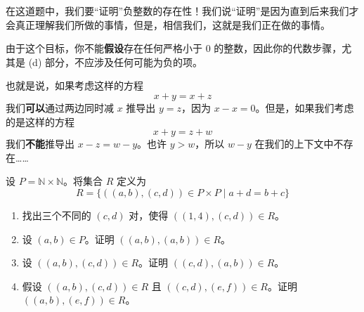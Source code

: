\begin{exercise}\label{exc:exercises3.11.22}
    在这道题中，我们要``证明''负整数的存在性！我们说``证明''是因为直到后来我们才会真正理解我们所做的事情，但是，相信我们，这就是我们正在做的事情。

    由于这个目标，你不能\textbf{假设}存在任何严格小于 $0$ 的整数，因此你的代数步骤，尤其是 (d) 部分，不应涉及任何可能为负的项。

    也就是说，如果考虑这样的方程
    \[x + y = x + z\]
    我们\textbf{可以}通过两边同时减 $x$ 推导出 $y = z$，因为 $x - x = 0$。但是，如果我们考虑的是这样的方程
    \[x + y = z + w\]
    我们\textbf{不能}推导出 $x - z = w - y$。也许 $y > w$，所以 $w - y$ 在我们的上下文中不存在……

    设 $P = \mathbb{N} \times \mathbb{N}$。将集合 $R$ 定义为
    \[R = \{((a, b),(c, d)) \in P \times P \mid a + d = b + c\}\]
    \begin{enumerate}[label=(\alph*)]
        \item 找出三个不同的 $(c, d)$ 对，使得 $((1, 4),(c, d)) \in R$。
        \item 设 $(a, b) \in P$。证明 $((a, b),(a, b)) \in R$。
        \item 设 $((a, b),(c, d)) \in R$。证明 $((c, d),(a, b)) \in R$。
        \item 假设 $((a, b),(c, d)) \in R$ 且 $((c, d),(e, f)) \in R$。证明 $((a, b),(e, f)) \in R$。
    \end{enumerate}
\end{exercise}